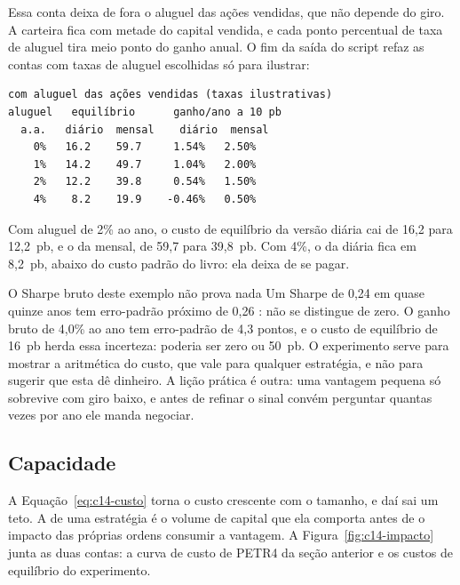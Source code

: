 Essa conta deixa de fora o aluguel das ações vendidas, que não depende do giro. A carteira fica com metade do capital vendida, e cada ponto percentual de taxa de aluguel tira meio ponto do ganho anual. O fim da saída do script refaz as contas com taxas de aluguel escolhidas só para ilustrar:

\begin{lstlisting}[style=saida]
com aluguel das ações vendidas (taxas ilustrativas)
aluguel   equilíbrio      ganho/ano a 10 pb
  a.a.   diário  mensal    diário  mensal
    0%   16.2    59.7     1.54%   2.50%
    1%   14.2    49.7     1.04%   2.00%
    2%   12.2    39.8     0.54%   1.50%
    4%    8.2    19.9    -0.46%   0.50%
\end{lstlisting}

Com aluguel de 2\% ao ano, o custo de equilíbrio da versão diária cai de 16,2 para 12,2~pb, e o da mensal, de 59,7 para 39,8~pb. Com 4\%, o da diária fica em 8,2~pb, abaixo do custo padrão do livro: ela deixa de se pagar.


\begin{armadilha}{O Sharpe bruto deste exemplo não prova nada}
Um Sharpe de 0,24 em quase quinze anos tem erro-padrão próximo de 0,26 \citep{lo2002}: não se distingue de zero. O ganho bruto de 4,0\% ao ano tem erro-padrão de 4,3 pontos, e o custo de equilíbrio de 16~pb herda essa incerteza: poderia ser zero ou 50~pb. O experimento serve para mostrar a aritmética do custo, que vale para qualquer estratégia, e não para sugerir que esta dê dinheiro. A lição prática é outra: uma vantagem pequena só sobrevive com giro baixo, e antes de refinar o sinal convém perguntar quantas vezes por ano ele manda negociar.
\end{armadilha}

\subsection{Capacidade}

A Equação~\eqref{eq:c14-custo} torna o custo crescente com o tamanho, e daí sai um teto. A  de uma estratégia é o volume de capital que ela comporta antes de o impacto das próprias ordens consumir a vantagem. A Figura~\ref{fig:c14-impacto} junta as duas contas: a curva de custo de PETR4 da seção anterior e os custos de equilíbrio do experimento.

